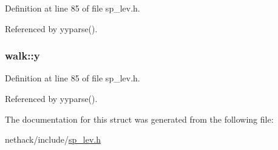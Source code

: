 Definition at line 85 of file sp\+\_\+lev.\+h.



Referenced by yyparse().

\hypertarget{structwalk_a738efbffc3ee8b59c522ee8d1a73b37b}{
\subsubsection[{y}]{ walk\+::y}}\label{structwalk_a738efbffc3ee8b59c522ee8d1a73b37b}


Definition at line 85 of file sp\+\_\+lev.\+h.



Referenced by yyparse().



The documentation for this struct was generated from the following file\+:\begin{DoxyCompactItemize}
\item 
nethack/include/\hyperlink{sp__lev_8h}{sp\+\_\+lev.\+h}\end{DoxyCompactItemize}

